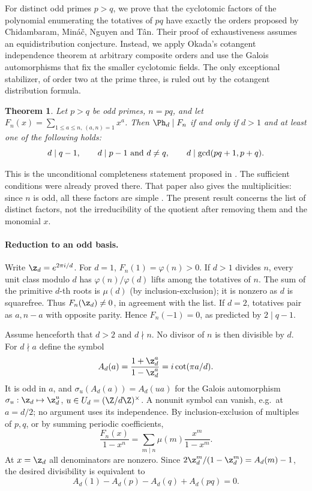 \documentclass[11pt,a4paper]{article}
\numberwithin{equation}{section}
\newtheorem{theorem}{Theorem}[section]
\theoremstyle{definition}
\theoremstyle{remark}
\newenvironment{sectionabstract}{\par\smallskip\begingroup\small\noindent}{\par\endgroup\medskip}
\begin{document}
\begin{sectionabstract}
For distinct odd primes \(p>q\), we prove that the cyclotomic factors of the polynomial enumerating the totatives of \(pq\) have exactly the orders proposed by Chidambaram, Min\'a\v{c}, Nguyen and T\^an. Their proof of exhaustiveness assumes an equidistribution conjecture. Instead, we apply Okada's cotangent independence theorem at arbitrary composite orders and use the Galois automorphisms that fix the smaller cyclotomic fields. The only exceptional stabilizer, of order two at the prime three, is ruled out by the cotangent distribution formula.
\end{sectionabstract}

\begin{theorem}\label{r47reiwa:T}
Let \(p>q\) be odd primes, \(n=pq\), and let \(F_n(x)=\sum_{1\leq a\leq n,\, (a,n)=1}x^a\).
Then \(\Ph_d\mid F_n\) if and only if \(d>1\) and at least one of the following holds:
\[
 d\mid q-1,\qquad d\mid p-1\ \hbox{and }d\neq q,\qquad
 d\mid\gcd(pq+1,p+q).
\]
\end{theorem}
This is the unconditional completeness statement proposed in \cite[Prop.~3.1, Thm.~3.2]{r47reiwa:CMNT}. The sufficient conditions were already proved there. That paper also gives the multiplicities: since \(n\) is odd, all these factors are simple \cite[Thm.~2.29]{r47reiwa:CMNT}. The present result concerns the list of distinct factors, not the irreducibility of the quotient after removing them and the monomial \(x\).

\paragraph{Reduction to an odd basis.}
Write \(\z_d=e^{2\pi i/d}\). For \(d=1\), \(F_n(1)=\varphi(n)>0\). If \(d>1\) divides \(n\), every unit class modulo \(d\) has \(\varphi(n)/\varphi(d)\) lifts among the totatives of \(n\). The sum of the primitive \(d\)-th roots is \(\mu(d)\) (by inclusion-exclusion); it is nonzero as \(d\) is squarefree. Thus \(F_n(\z_d)\ne0\), in agreement with the list. If \(d=2\), totatives pair as \(a,n-a\) with opposite parity. Hence \(F_n(-1)=0\), as predicted by \(2\mid q-1\).

Assume henceforth that \(d>2\) and \(d\nmid n\). No divisor of \(n\) is then divisible by \(d\). For \(d\nmid a\) define the symbol
\[
 A_d(a)=\frac{1+\z_d^a}{1-\z_d^a}=i\cot(\pi a/d).
\]
It is odd in \(a\), and \(\sigma_u(A_d(a))=A_d(ua)\) for the Galois automorphism \(\sigma_u:\z_d\mapsto\z_d^u\), \(u\in U_d=(\Z/d\Z)^\times\). A nonunit symbol can vanish, e.g.\ at \(a=d/2\); no argument uses its independence. By inclusion-exclusion of multiples of \(p,q\), or by summing periodic coefficients,
\[
 \frac{F_n(x)}{1-x^n}=\sum_{m\mid n}\mu(m)\frac{x^m}{1-x^m}.
\]
At \(x=\z_d\) all denominators are nonzero. Since \(2\z_d^m/(1-\z_d^m)=A_d(m)-1\), the desired divisibility is equivalent to
\begin{equation}\label{r47reiwa:E}
 A_d(1)-A_d(p)-A_d(q)+A_d(pq)=0 .
\end{equation}
\end{document}
